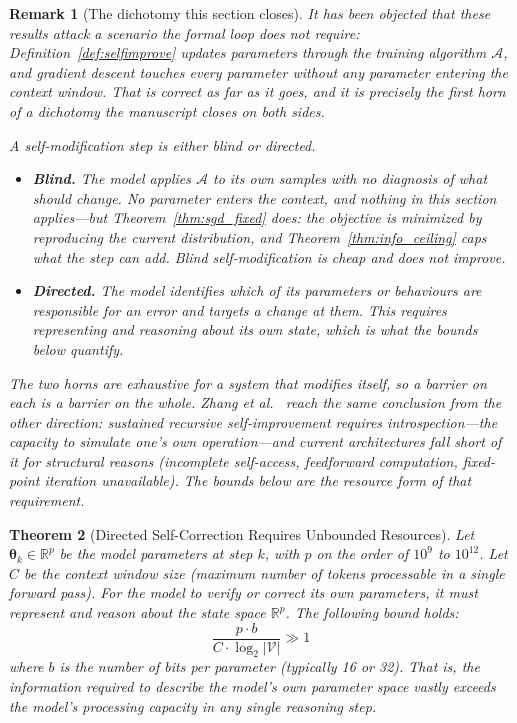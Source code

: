 \documentclass[11pt,a4paper]{article}
\newtheorem{theorem}{Theorem}[section]
\newtheorem{remark}[theorem]{Remark}
\begin{document}
\begin{remark}[The dichotomy this section closes]
\label{rem:context_scope}
It has been objected that these results attack a scenario the formal loop does not require: Definition~\ref{def:selfimprove} updates parameters through the training algorithm $\mathcal{A}$, and gradient descent touches every parameter without any parameter entering the context window. That is correct as far as it goes, and it is precisely the first horn of a dichotomy the manuscript closes on both sides.

A self-modification step is either \emph{blind} or \emph{directed}.
\begin{itemize}
    \item \textbf{Blind.} The model applies $\mathcal{A}$ to its own samples with no diagnosis of what should change. No parameter enters the context, and nothing in this section applies---but Theorem~\ref{thm:sgd_fixed} does: the objective is minimized by reproducing the current distribution, and Theorem~\ref{thm:info_ceiling} caps what the step can add. Blind self-modification is cheap and does not improve.
    \item \textbf{Directed.} The model identifies which of its parameters or behaviours are responsible for an error and targets a change at them. This requires representing and reasoning about its own state, which is what the bounds below quantify.
\end{itemize}
The two horns are exhaustive for a system that modifies itself, so a barrier on each is a barrier on the whole. Zhang et al.~\cite{zhang2026introspection} reach the same conclusion from the other direction: sustained recursive self-improvement requires introspection---the capacity to simulate one's own operation---and current architectures fall short of it for structural reasons (incomplete self-access, feedforward computation, fixed-point iteration unavailable). The bounds below are the resource form of that requirement.
\end{remark}

\begin{theorem}[Directed Self-Correction Requires Unbounded Resources]
\label{thm:context}
Let $\bm{\theta}_k \in \mathbb{R}^p$ be the model parameters at step $k$, with $p$ on the order of $10^{9}$ to $10^{12}$. Let $C$ be the context window size (maximum number of tokens processable in a single forward pass). For the model to verify or correct its own parameters, it must represent and reason about the state space $\mathbb{R}^p$. The following bound holds:
\begin{equation}
\frac{p \cdot b}{C \cdot \log_2 |\mathcal{V}|} \gg 1
\end{equation}
where $b$ is the number of bits per parameter (typically 16 or 32). That is, the information required to describe the model's own parameter space vastly exceeds the model's processing capacity in any single reasoning step.
\end{theorem}
\end{document}
